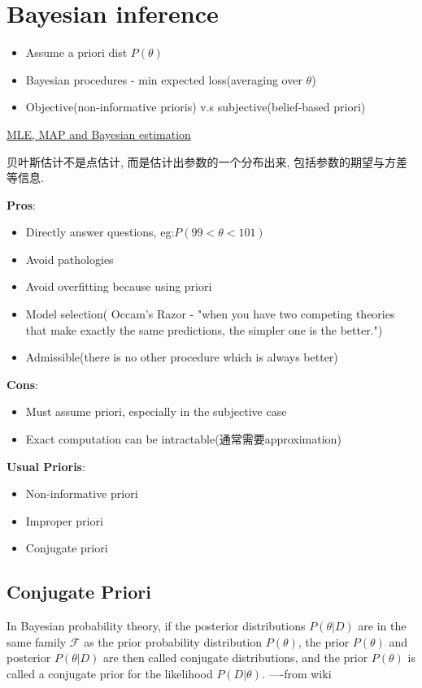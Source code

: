 \documentclass{article}
\begin{document}
\section{Bayesian inference}
\begin{itemize}
\item Assume a priori dist $P(\theta)$
\item Bayesian procedures - min expected loss(averaging over $\theta$)
\item Objective(non-informative prioris) v.s subjective(belief-based priori)
\end{itemize}

\href{http://blog.csdn.net/yangliuy/article/details/8296481}{MLE, MAP and Bayesian estimation}

贝叶斯估计不是点估计, 而是估计出参数的一个分布出来, 包括参数的期望与方差等信息.

\textbf{Pros}:
\begin{itemize}
\item Directly answer questions, eg:$P(99 < \theta < 101)$
\item Avoid pathologies
\item Avoid overfitting because using priori
\item Model selection( Occam's Razor - "when you have two competing theories that make exactly the same predictions, the simpler one is the better.")
\item Admissible(there is no other procedure which is always better)
\end{itemize}

\textbf{Cons}:
\begin{itemize}
\item Must assume priori, especially in the subjective case
\item Exact computation can be intractable(通常需要approximation)
\end{itemize}

\textbf{Usual Prioris}:
\begin{itemize}
\item Non-informative priori
\item Improper priori
\item Conjugate priori
\end{itemize}

\subsection{Conjugate Priori}
\begin{definition}
In Bayesian probability theory, if the posterior distributions $P(\theta|D)$ are in the same family $\mathcal{F}$ as 
the prior probability distribution $P(\theta)$, the prior $P(\theta)$ and posterior $P(\theta|D)$ are then called conjugate distributions, 
and the prior $P(\theta)$ is called a conjugate prior for the likelihood $P(D|\theta)$. ----from wiki
\end{definition}
\end{document}
